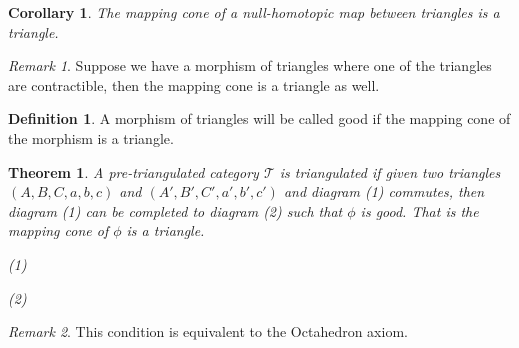 \documentclass[11pt]{article}
\newtheorem{theorem}{Theorem}[section]
\newtheorem{corollary}{Corollary}[theorem]
\theoremstyle{definition}
\newtheorem{definition}{Definition}[section]
\theoremstyle{remark}
\newtheorem*{remark}{Remark}
\begin{document}
            \begin{corollary}
                The mapping cone of a null-homotopic map between  triangles is a triangle.
            \end{corollary}

            \begin{remark}
                Suppose we have a morphism of triangles where one of the triangles are contractible, then the mapping cone is a triangle as well.
            \end{remark}

            \begin{definition}
                A morphism of triangles will be called good if the mapping cone of the morphism is a triangle.
            \end{definition}

            \begin{theorem}
                A pre-triangulated category $\mathcal{T}$ is triangulated if given two triangles $(A,B,C,a,b,c)$ and $(A',B',C',a',b',c')$ and diagram (1) commutes, then diagram (1) can be completed to diagram (2) such that $\phi$ is good. That is the mapping cone of $\phi$ is a triangle.
                \begin{center}
                    (1)
                    (2)
                \end{center}
            \end{theorem}

            \begin{remark}
                This condition is equivalent to the Octahedron axiom.
            \end{remark}
\end{document}

